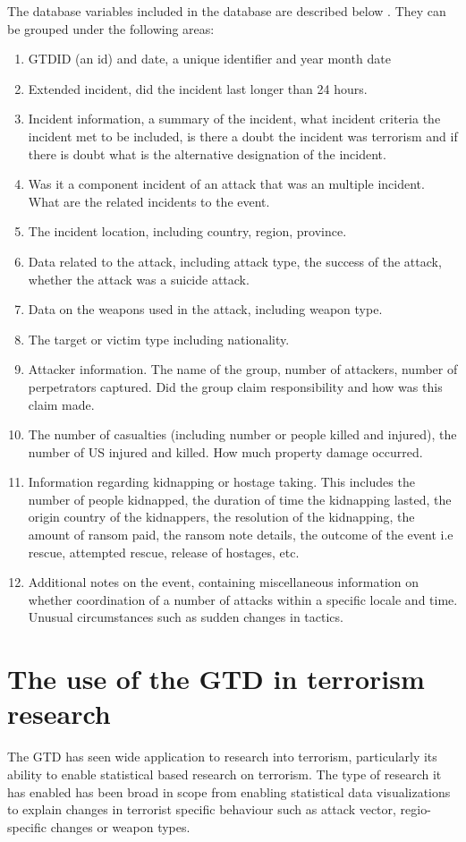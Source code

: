 The database variables included in the database are described below . They can be grouped under the following areas:
\begin{enumerate}
\item GTDID (an id) and date, a unique identifier and year month date
\item Extended incident, did the incident last longer than 24 hours.
\item Incident information, a summary of the incident, what incident criteria the incident met to be included, is there a doubt the incident was terrorism and if there is doubt what is the alternative designation of the incident. 
\item Was it a component incident of an attack that was an multiple incident. What are the related incidents to the event.
\item The incident location, including country, region, province. 
\item  Data related to the attack, including attack type, the success of the attack, whether the attack was a suicide attack.
\item Data on the weapons used in the attack, including weapon type.
\item The target or victim type including nationality.
\item Attacker information. The name of the group, number of attackers, number of perpetrators captured. Did the group claim responsibility and how was this claim made.
\item The number of casualties (including number or people killed and injured), the number of US injured and killed. How much property damage occurred.
\item Information regarding kidnapping or hostage taking. This includes the number of people kidnapped, the duration of time the kidnapping lasted, the origin country of the kidnappers, the resolution of the kidnapping, the amount of ransom paid, the ransom note details, the outcome of the event i.e rescue, attempted rescue, release of hostages, etc.   
\item Additional notes on the event, containing miscellaneous information on whether coordination of a number of attacks within a specific locale and time. Unusual circumstances such as sudden changes in tactics.
\end{enumerate}

\section{The use of the GTD in terrorism research}
The GTD has seen wide application to research into terrorism, particularly its ability to enable statistical based research on terrorism. The type of research it has enabled has been broad in scope from enabling statistical data visualizations to explain changes in terrorist specific behaviour such as attack vector, regio-specific changes or weapon types. 

